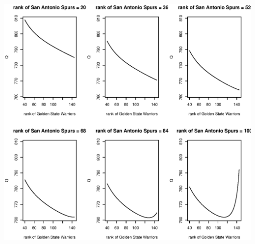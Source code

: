 \documentclass[11pt]{report}
\theoremstyle{definition}
\theoremstyle{remark}
\begin{document}
\begin{enumerate}
\begin{enumerate}
   \includegraphics[width=\textwidth]{a2_profile.eps}
    \end{enumerate}

\end{enumerate}
\end{document}
